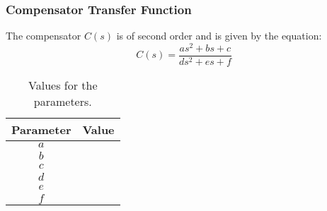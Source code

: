 \documentclass{article}
\begin{document}
\subsubsection{Compensator Transfer Function}
The compensator \(C(s)\) is of second order and is given by the equation:
\[
C(s) = \frac{as^2 + bs + c}{ds^2 + es + f}
\]
\begin{table}[!htb]
    \centering
    \begin{tabular}{|c|c|}
        \hline
        Parameter & Value \\ \hline
        \( a \) & \\
        \( b \) & \\
        \( c \) & \\
        \( d \) & \\
        \( e \) & \\
        \( f \) & \\ \hline
    \end{tabular}
    \caption{Values for the parameters.}
\end{table}
\end{document}
